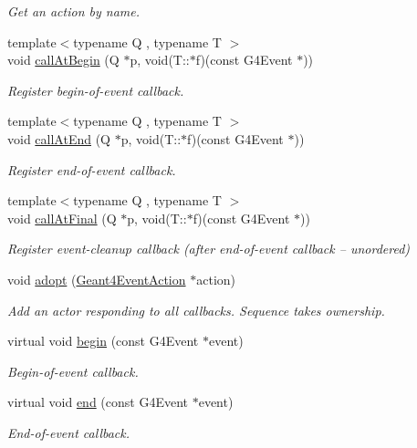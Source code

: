 \begin{DoxyCompactItemize}
\begin{DoxyCompactList}\small\item\em Get an action by name. \end{DoxyCompactList}\item 
{\footnotesize template$<$typename Q , typename T $>$ }\\void \hyperlink{class_d_d4hep_1_1_simulation_1_1_geant4_event_action_sequence_a84e628e9ef517fc1c0b16b19a876ba32}{call\+At\+Begin} (Q $\ast$p, void(T\+::$\ast$f)(const G4\+Event $\ast$))
\begin{DoxyCompactList}\small\item\em Register begin-\/of-\/event callback. \end{DoxyCompactList}\item 
{\footnotesize template$<$typename Q , typename T $>$ }\\void \hyperlink{class_d_d4hep_1_1_simulation_1_1_geant4_event_action_sequence_a136505d70b13db82a9339135330bda6a}{call\+At\+End} (Q $\ast$p, void(T\+::$\ast$f)(const G4\+Event $\ast$))
\begin{DoxyCompactList}\small\item\em Register end-\/of-\/event callback. \end{DoxyCompactList}\item 
{\footnotesize template$<$typename Q , typename T $>$ }\\void \hyperlink{class_d_d4hep_1_1_simulation_1_1_geant4_event_action_sequence_afeb7603fa772b6a776fafd81dc287171}{call\+At\+Final} (Q $\ast$p, void(T\+::$\ast$f)(const G4\+Event $\ast$))
\begin{DoxyCompactList}\small\item\em Register event-\/cleanup callback (after end-\/of-\/event callback -- unordered) \end{DoxyCompactList}\item 
void \hyperlink{class_d_d4hep_1_1_simulation_1_1_geant4_event_action_sequence_a21013600fd6c11994991e76878fb0896}{adopt} (\hyperlink{class_d_d4hep_1_1_simulation_1_1_geant4_event_action}{Geant4\+Event\+Action} $\ast$action)
\begin{DoxyCompactList}\small\item\em Add an actor responding to all callbacks. Sequence takes ownership. \end{DoxyCompactList}\item 
virtual void \hyperlink{class_d_d4hep_1_1_simulation_1_1_geant4_event_action_sequence_a77375888d2519a2095ded294c540ebec}{begin} (const G4\+Event $\ast$event)
\begin{DoxyCompactList}\small\item\em Begin-\/of-\/event callback. \end{DoxyCompactList}\item 
virtual void \hyperlink{class_d_d4hep_1_1_simulation_1_1_geant4_event_action_sequence_a5815e04637704ceddb2abd2677e1522b}{end} (const G4\+Event $\ast$event)
\begin{DoxyCompactList}\small\item\em End-\/of-\/event callback. \end{DoxyCompactList}\end{DoxyCompactItemize}

